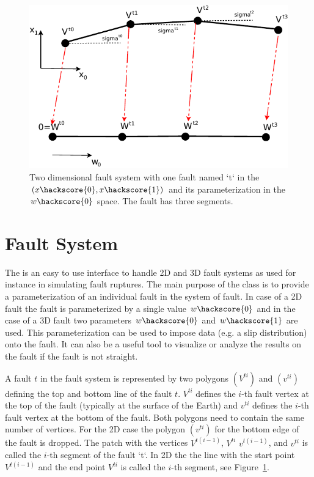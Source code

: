 \begin{figure}
\includegraphics[width=\textwidth]{figures/FaultSystem2D}
\caption{\label{FAULTSYSTEM2D}Two dimensional fault system with one fault named `t` in the $(x\hackscore{0},x\hackscore{1})$ and its parameterization in the
$w\hackscore{0}$ space. The fault has three segments.}
\end{figure}

\section{Fault System}
\label{Fault System}
The  is an easy to use interface to handle 2D and 3D fault systems  as used for instance in simulating fault ruptures. The main purpose of the class is to provide a parameterization of an individual fault in the system of fault. In case of a 2D fault the fault is parameterized by a single value $w\hackscore{0}$ and in the case of a 3D fault two parameters $w\hackscore{0}$ and $w\hackscore{1}$ are used. This parameterization can be used
to impose data (e.g. a slip distribution) onto the fault. It can also be a useful tool to visualize or analyze the results on the fault if the fault is not straight. 

A fault $t$ in the fault system is represented by two polygons $(V^{ti})$ and $(v^{ti})$
defining the top and bottom line of the fault $t$.
$V^{ti}$ defines the $i$-th fault vertex at the top of the fault (typically at the surface of the Earth) and
$v^{ti}$ defines the $i$-th fault vertex at the bottom of the fault. Both polygons need to contain the same number of 
vertices. For the 2D case the polygon $(v^{ti})$ for the bottom edge of the fault is dropped. 
The patch with the vertices 
$V^{t(i-1)}$, $V^{ti}$
$v^{t(i-1)}$, and $v^{ti}$
is called the $i$-th segment of the fault `t`. In 2D the the line with the start point $V^{t(i-1)}$ 
and the end point $V^{ti}$ is called the $i$-th segment, see Figure~\ref{FAULTSYSTEM2D}.

